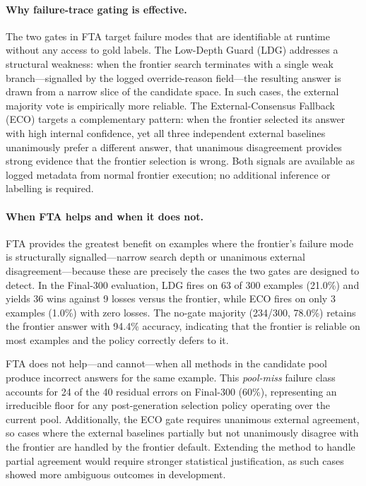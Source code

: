 \documentclass[smallcondensed]{svjour3}
\begin{document}
\paragraph{Why failure-trace gating is effective.}
The two gates in FTA target failure modes that are identifiable at runtime
without any access to gold labels.
The Low-Depth Guard (LDG) addresses a structural weakness: when the frontier
search terminates with a single weak branch---signalled by the logged
override-reason field---the resulting answer is drawn from a narrow slice of
the candidate space.
In such cases, the external majority vote is empirically more reliable.
The External-Consensus Fallback (ECO) targets a complementary pattern: when
the frontier selected its answer with high internal confidence, yet all three
independent external baselines unanimously prefer a different answer, that
unanimous disagreement provides strong evidence that the frontier selection
is wrong.
Both signals are available as logged metadata from normal frontier execution;
no additional inference or labelling is required.

\paragraph{When FTA helps and when it does not.}
FTA provides the greatest benefit on examples where the frontier's failure mode
is structurally signalled---narrow search depth or unanimous external
disagreement---because these are precisely the cases the two gates are designed
to detect.
In the Final-300 evaluation, LDG fires on 63 of 300 examples (21.0\%) and
yields 36 wins against 9 losses versus the frontier, while ECO fires on only
3 examples (1.0\%) with zero losses.
The no-gate majority (234/300, 78.0\%) retains the frontier answer with 94.4\%
accuracy, indicating that the frontier is reliable on most examples and the
policy correctly defers to it.

FTA does not help---and cannot---when all methods in the candidate pool produce
incorrect answers for the same example.
This \emph{pool-miss} failure class accounts for 24 of the 40 residual errors
on Final-300 (60\%), representing an irreducible floor for any post-generation
selection policy operating over the current pool.
Additionally, the ECO gate requires unanimous external agreement, so cases
where the external baselines partially but not unanimously disagree with the
frontier are handled by the frontier default.
Extending the method to handle partial agreement would require stronger
statistical justification, as such cases showed more ambiguous outcomes in
development.
\end{document}
